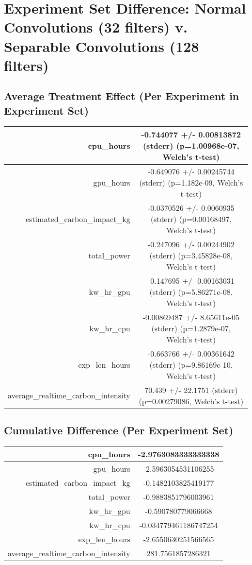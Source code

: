 \documentclass{article}%
\begin{document}
%
\normalsize%
\section{Experiment Set Difference: Normal Convolutions (32 filters) v. Separable Convolutions (128 filters)}%
\label{sec:Experiment Set Difference Normal Convolutions (32 filters) v. Separable Convolutions (128 filters)}%
\subsection{Average Treatment Effect (Per Experiment in Experiment Set)}%
\label{subsec:Average Treatment Effect (Per Experiment in Experiment Set)}%
\begin{tabular}{|r|c|}%
\hline%
cpu\_hours&{-}0.744077 +/{-} 0.00813872 (stderr) (p=1.00968e{-}07, Welch's t{-}test)\\%
\hline%
gpu\_hours&{-}0.649076 +/{-} 0.00245744 (stderr) (p=1.182e{-}09, Welch's t{-}test)\\%
\hline%
estimated\_carbon\_impact\_kg&{-}0.0370526 +/{-} 0.0060935 (stderr) (p=0.00168497, Welch's t{-}test)\\%
\hline%
total\_power&{-}0.247096 +/{-} 0.00244902 (stderr) (p=3.45828e{-}08, Welch's t{-}test)\\%
\hline%
kw\_hr\_gpu&{-}0.147695 +/{-} 0.00163031 (stderr) (p=5.86271e{-}08, Welch's t{-}test)\\%
\hline%
kw\_hr\_cpu&{-}0.00869487 +/{-} 8.65611e{-}05 (stderr) (p=1.2879e{-}07, Welch's t{-}test)\\%
\hline%
exp\_len\_hours&{-}0.663766 +/{-} 0.00361642 (stderr) (p=9.86169e{-}10, Welch's t{-}test)\\%
\hline%
average\_realtime\_carbon\_intensity&70.439 +/{-} 22.1751 (stderr) (p=0.00279086, Welch's t{-}test)\\%
\hline%
\end{tabular}

%
\subsection{Cumulative Difference (Per Experiment Set)}%
\label{subsec:Cumulative Difference (Per Experiment Set)}%
\begin{tabular}{|r|c|}%
\hline%
cpu\_hours&{-}2.9763083333333338\\%
\hline%
gpu\_hours&{-}2.5963054531106255\\%
\hline%
estimated\_carbon\_impact\_kg&{-}0.1482103825419177\\%
\hline%
total\_power&{-}0.9883851796003961\\%
\hline%
kw\_hr\_gpu&{-}0.590780779066668\\%
\hline%
kw\_hr\_cpu&{-}0.034779461186747254\\%
\hline%
exp\_len\_hours&{-}2.6550630251566565\\%
\hline%
average\_realtime\_carbon\_intensity&281.7561857286321\\%
\hline%
\end{tabular}

%
\end{document}
